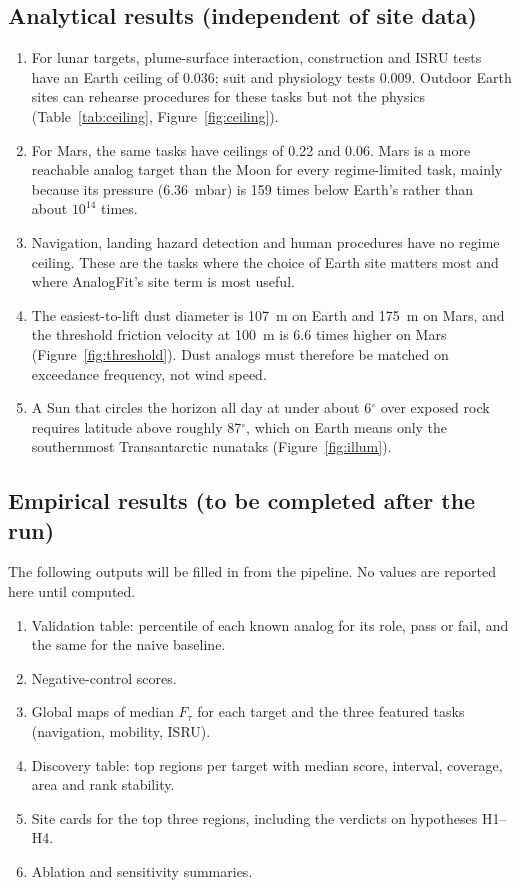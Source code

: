 \documentclass[11pt,a4paper]{article}
\begin{document}
\subsection{Analytical results (independent of site data)}
\begin{enumerate}
\item For lunar targets, plume-surface interaction, construction and ISRU tests have an Earth ceiling of 0.036; suit and physiology tests 0.009. Outdoor Earth sites can rehearse procedures for these tasks but not the physics (Table~\ref{tab:ceiling}, Figure~\ref{fig:ceiling}).
\item For Mars, the same tasks have ceilings of 0.22 and 0.06. Mars is a more reachable analog target than the Moon for every regime-limited task, mainly because its pressure (6.36~mbar) is 159 times below Earth's rather than about $10^{14}$ times.
\item Navigation, landing hazard detection and human procedures have no regime ceiling. These are the tasks where the choice of Earth site matters most and where AnalogFit's site term is most useful.
\item The easiest-to-lift dust diameter is 107~\textmu m on Earth and 175~\textmu m on Mars, and the threshold friction velocity at 100~\textmu m is 6.6 times higher on Mars (Figure~\ref{fig:threshold}). Dust analogs must therefore be matched on exceedance frequency, not wind speed.
\item A Sun that circles the horizon all day at under about 6$^\circ$ over exposed rock requires latitude above roughly 87$^\circ$, which on Earth means only the southernmost Transantarctic nunataks (Figure~\ref{fig:illum}).
\end{enumerate}

\subsection{Empirical results (to be completed after the run)}
The following outputs will be filled in from the pipeline. No values are reported here until computed.
\begin{enumerate}
\item Validation table: percentile of each known analog for its role, pass or fail, and the same for the naive baseline.
\item Negative-control scores.
\item Global maps of median $F_\tau$ for each target and the three featured tasks (navigation, mobility, ISRU).
\item Discovery table: top regions per target with median score, interval, coverage, area and rank stability.
\item Site cards for the top three regions, including the verdicts on hypotheses H1--H4.
\item Ablation and sensitivity summaries.
\end{enumerate}
\end{document}
